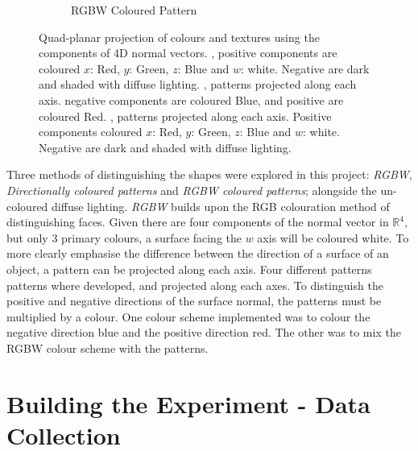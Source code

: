 \documentclass{l4proj}
\begin{document}
\begin{figure}
\begin{subfigure}[b]{0.32\textwidth}
    \caption{
      RGBW Coloured Pattern
    }
    \label{fig:tex3}
  \end{subfigure}
  \caption{
    Quad-planar projection of colours and textures using the components of 4D normal vectors.
    , positive components are coloured $x$: Red, $y$: Green, $z$: Blue and $w$: white. Negative are dark and shaded with diffuse lighting.
    , patterns projected along each axis. negative components are coloured Blue, and positive are coloured Red.
    , patterns projected along each axis. Positive components coloured $x$: Red, $y$: Green, $z$: Blue and $w$: white. Negative are dark and shaded with diffuse lighting.
  }
  \label{fig:textures}
\end{figure}
%
Three methods of distinguishing the shapes were explored in this project: \textit{RGBW}, \textit{Directionally coloured patterns} and \textit{RGBW coloured patterns}; alongside the un-coloured diffuse lighting. 
\textit{RGBW} builds upon the RGB colouration method of distinguishing faces. Given there are four components of the normal vector in $\mathbb{R}^4$, but only 3 primary colours, a surface facing the $w$ axis will be coloured white.
To more clearly emphasise the difference between the direction of a surface of an object, a pattern can be projected along each axis. 
Four different patterns patterns where developed, and projected along each axes. To distinguish the positive and negative directions of the surface normal, the patterns must be multiplied by a colour. One colour scheme implemented was to colour the negative direction blue and the positive direction red. The other was to mix the RGBW colour scheme with the patterns.

\section{Building the Experiment - Data Collection}
\end{document}
